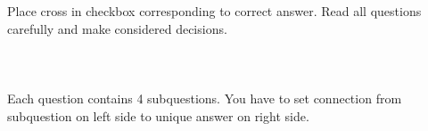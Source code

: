 \documentclass{report}
\begin{document}
\title{
}

\date{
}
\vfill
\author{
}
\maketitle
\clearpage




\chapter{}
Place cross in checkbox corresponding to correct answer. Read all questions carefully and make considered decisions.\\\\






\chapter{}
Each question contains 4 subquestions. You have to set connection from subquestion on left side to unique answer on right side.\\\\
\end{document}
